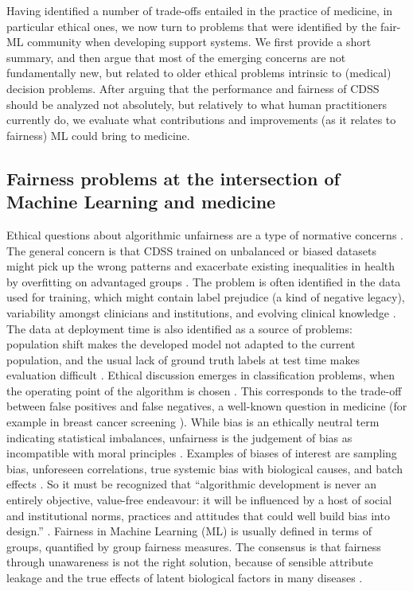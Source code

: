 Having identified a number of trade-offs entailed in the practice of medicine, in particular ethical ones, we now turn to problems that were identified by the fair-ML community when developing support systems.
We first provide a short summary, and then argue that most of the emerging concerns are not fundamentally new, but related to older ethical problems intrinsic to (medical) decision problems.
After arguing that the performance and fairness of CDSS should be analyzed not absolutely, but relatively to what human practitioners currently do,
we evaluate what contributions and improvements (as it relates to fairness) ML could bring to medicine. 


\subsection{Fairness problems at the intersection of Machine Learning and medicine}
    Ethical questions about algorithmic unfairness are a type of normative concerns \cite{Morley2020}.
    The general concern is that CDSS trained on unbalanced or biased datasets might pick up the wrong patterns and exacerbate existing inequalities in health by overfitting on advantaged groups \cite{Morley2020}\cite{Chen2021}.
    The problem is often identified in the data used for training, which might contain label prejudice (a kind of negative legacy), variability amongst clinicians and institutions, and evolving clinical knowledge \cite{Chen2021}.
    The data at deployment time is also identified as a source of problems: population shift makes the developed model not adapted to the current population, and the usual lack of ground truth labels at test time makes evaluation difficult \cite{Chen2021}.
    Ethical discussion emerges in classification problems, when the operating point of the algorithm is chosen \cite{Fletcher2021}.
    This corresponds to the trade-off between false positives and false negatives, a well-known question in medicine (for example in breast cancer screening \cite{Fletcher2021}).
    While bias is an ethically neutral term indicating statistical imbalances, unfairness is the judgement of bias as incompatible with moral principles \cite{Fletcher2021}.
    Examples of biases of interest are sampling bias, unforeseen correlations, true systemic bias with biological causes, and batch effects \cite{Fletcher2021}.
    So it must be recognized that ``algorithmic development is never an entirely objective, value-free endeavour: it will be influenced by a host of social and institutional norms, practices and attitudes that could well build bias into design.'' \cite[p.~673]{Zerilli2019}.
    Fairness in Machine Learning (ML) is usually defined in terms of groups, quantified by group fairness measures.
    The consensus is that fairness through unawareness is not the right solution, because of sensible attribute leakage and the true effects of latent biological factors in many diseases \cite{Chen2021}.



